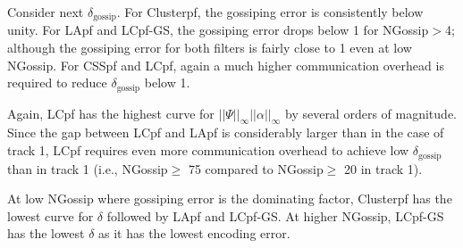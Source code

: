 \documentclass[10pt,letterpaper,final]{article}
\begin{document}
Consider next $\delta_{\text{gossip}}$. For Clusterpf, the gossiping error is consistently below unity. For LApf and LCpf-GS, the gossiping error drops below 1 for NGossip$>$4; although the gossiping error for both filters is fairly close to 1 even at low NGossip. For CSSpf and LCpf, again a much higher communication overhead is required to reduce $\delta_{\text{gossip}}$ below 1. 

Again, LCpf has the highest curve for $||\Psi||_\infty||\alpha||_\infty$ by several orders of magnitude. Since the gap between LCpf and LApf is considerably larger than in the case of track 1, LCpf requires even more communication overhead to achieve low $\delta_{\text{gossip}}$ than in track 1 (i.e., NGossip$\geq$ 75 compared to NGossip$\geq$ 20 in track 1). 

At low NGossip where gossiping error is the dominating factor, Clusterpf has the lowest curve for $\delta$ followed by LApf and LCpf-GS. At higher NGossip, LCpf-GS has the lowest $\delta$ as it has the lowest encoding error. 
\end{document}
